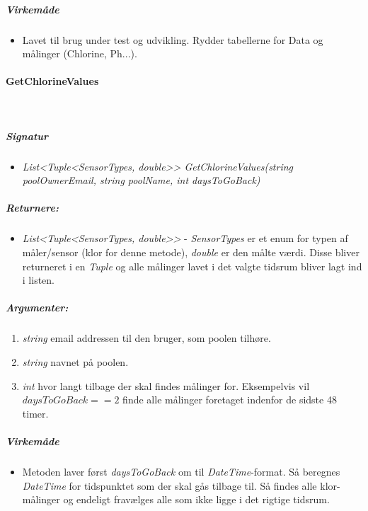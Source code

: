 \subparagraph{Virkemåde}
\begin{itemize}
	\item Lavet til brug under test og udvikling. Rydder tabellerne for Data og målinger (Chlorine, Ph...).
\end{itemize}







\paragraph{GetChlorineValues}\ %






\subparagraph{Signatur}
\begin{itemize}
	\item \textit{List<Tuple<SensorTypes, double>> GetChlorineValues(string poolOwnerEmail, string poolName, int daysToGoBack)}
\end{itemize}

\subparagraph{Returnere:}
\begin{itemize}
	\item \textit{List<Tuple<SensorTypes, double>>} - \textit{SensorTypes} er et enum for typen af måler/sensor (klor for denne metode), \textit{double} er den målte værdi. Disse bliver returneret i en \textit{Tuple} og alle målinger lavet i det valgte tidsrum bliver lagt ind i listen.
\end{itemize}

\subparagraph{Argumenter:}
\begin{enumerate}
	\item \textit{string} email addressen til den bruger, som poolen tilhøre.
	\item \textit{string} navnet på poolen.
	\item \textit{int} hvor langt tilbage der skal findes målinger for. Eksempelvis vil $daysToGoBack == 2$ finde alle målinger foretaget indenfor de sidste 48 timer.
\end{enumerate}

\subparagraph{Virkemåde}
\begin{itemize}
	\item Metoden laver først \textit{daysToGoBack} om til \textit{DateTime}-format. Så beregnes \textit{DateTime} for tidspunktet som der skal gås tilbage til. Så findes alle klor-målinger og endeligt fravælges alle som ikke ligge i det rigtige tidsrum.
\end{itemize}








